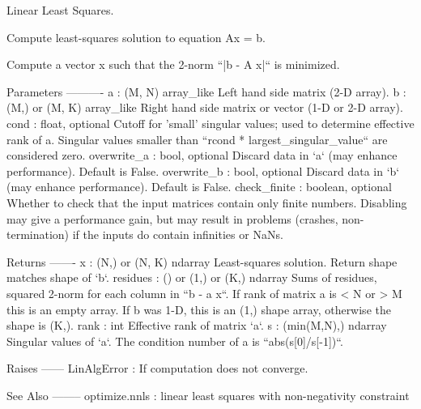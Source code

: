 Linear Least Squares. 

\begin{DoxyVerb}Compute least-squares solution to equation Ax = b.

Compute a vector x such that the 2-norm ``|b - A x|`` is minimized.

Parameters
----------
a : (M, N) array_like
    Left hand side matrix (2-D array).
b : (M,) or (M, K) array_like
    Right hand side matrix or vector (1-D or 2-D array).
cond : float, optional
    Cutoff for 'small' singular values; used to determine effective
    rank of a. Singular values smaller than
    ``rcond * largest_singular_value`` are considered zero.
overwrite_a : bool, optional
    Discard data in `a` (may enhance performance). Default is False.
overwrite_b : bool, optional
    Discard data in `b` (may enhance performance). Default is False.
check_finite : boolean, optional
    Whether to check that the input matrices contain only finite numbers.
    Disabling may give a performance gain, but may result in problems
    (crashes, non-termination) if the inputs do contain infinities or NaNs.

Returns
-------
x : (N,) or (N, K) ndarray
    Least-squares solution.  Return shape matches shape of `b`.
residues : () or (1,) or (K,) ndarray
    Sums of residues, squared 2-norm for each column in ``b - a x``.
    If rank of matrix a is < N or > M this is an empty array.
    If b was 1-D, this is an (1,) shape array, otherwise the shape is (K,).
rank : int
    Effective rank of matrix `a`.
s : (min(M,N),) ndarray
    Singular values of `a`. The condition number of a is
    ``abs(s[0]/s[-1])``.

Raises
------
LinAlgError :
    If computation does not converge.


See Also
--------
optimize.nnls : linear least squares with non-negativity constraint\end{DoxyVerb}
 \hypertarget{namespacescipy_1_1linalg_1_1basic_ab6ce4e24deea881fa02e1cab48cd4dc6}{}
